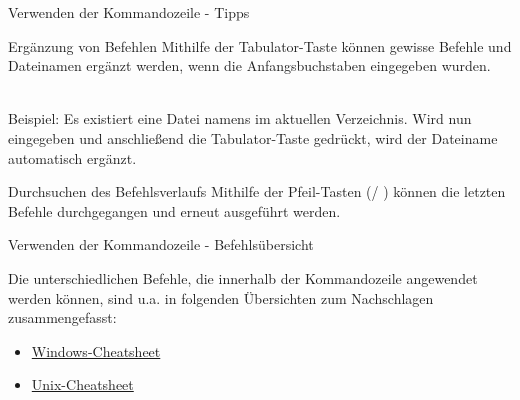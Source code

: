 \begin{frame}{Verwenden der Kommandozeile - Tipps}
    
    \begin{block}{Ergänzung von Befehlen}
      Mithilfe der Tabulator-Taste können gewisse Befehle und Dateinamen ergänzt werden, wenn die Anfangsbuchstaben eingegeben wurden. \\~\
      
      Beispiel: Es existiert eine Datei namens  im aktuellen Verzeichnis. Wird nun  eingegeben und anschließend die Tabulator-Taste gedrückt, wird der Dateiname automatisch ergänzt.
    \end{block}
    
    \begin{block}{Durchsuchen des Befehlsverlaufs}
      Mithilfe der Pfeil-Tasten (\textuparrow / \textdownarrow) können die letzten Befehle durchgegangen und erneut ausgeführt werden.
      
    \end{block}
\end{frame}
    
\begin{frame}{Verwenden der Kommandozeile - Befehlsübersicht}
    
    Die unterschiedlichen Befehle, die innerhalb der Kommandozeile angewendet werden können, sind u.a. in folgenden Übersichten zum Nachschlagen zusammengefasst:
    
\begin{itemize}
    \item \href{http://www.cs.columbia.edu/~sedwards/classes/2017/1102-spring/Command\%20Prompt\%20Cheatsheet.pdf}{Windows-Cheatsheet}
    
    \item \href{https://www2.icp.uni-stuttgart.de/~icp/mediawiki/images/b/bd/Sim_Meth_I_T0_cheat_sheet_10_11.pdf}{Unix-Cheatsheet}
\end{itemize}
\end{frame}
    
